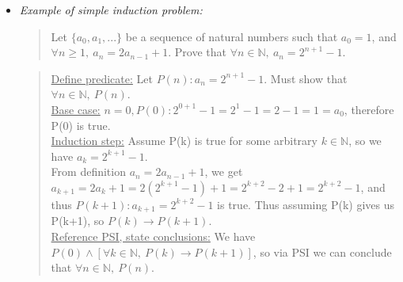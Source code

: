 \documentclass[11pt, oneside]{article}
\begin{document}
\begin{itemize}
\item \emph{Example of simple induction problem:}
	\begin{quote}
	Let $ \{ a_0, a_1, ...\}$ be a sequence of natural numbers such that $a_0 = 1$, and $\forall n \geq 1, \: a_n = 2a_{n-1}+1$. Prove that $\forall n \in \mathbb{N},\: a_n = 2^{n+1}-1$.
	\end{quote}
	\vspace{5pt}
	
	\begin{quote}
	\underline{Define predicate:} Let $P(n): a_n = 2^{n+1}-1$. Must show that $\forall n \in \mathbb{N},\: P(n)$. \\
	\underline{Base case:}  $n=0, P(0): 2^{0+1}-1 = 2^1-1 = 2-1 = 1 = a_0$, therefore P(0) is true. \\
	\underline{Induction step:} Assume P(k) is true for some arbitrary $k \in \mathbb{N}$, so we have $a_k = 2^{k+1}-1$. \\
	From definition $a_n = 2a_{n-1}+1$, we get $a_{k+1} = 2a_k+1 = 2(2^{k+1}-1)+1 = 2^{k+2}-2+1=2^{k+2}-1$, and thus $P(k+1): a_{k+1}=2^{k+2}-1$ is true. Thus assuming P(k) gives us P(k+1), so $P(k) \rightarrow P(k+1)$. \\
	\underline{Reference PSI, state conclusions:} We have $P(0) \land [\forall k \in \mathbb{N},\:P(k)\rightarrow P(k+1)] $, so via PSI we can conclude that $\forall n \in \mathbb{N},\: P(n)$.
	\end{quote}

\end{itemize}
\end{document}
